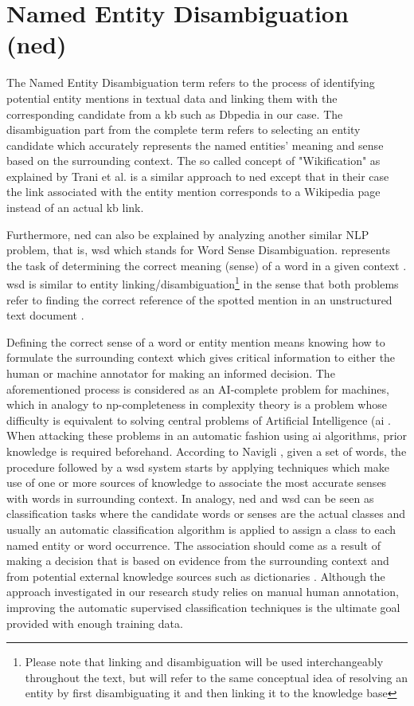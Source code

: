 \section{Named Entity Disambiguation (\ac{ned})}
The Named Entity Disambiguation term refers to the process of identifying potential entity mentions in textual data and linking them with the corresponding candidate from a \ac{kb} such as Dbpedia in our case. The disambiguation part from the complete term refers to selecting an entity candidate which accurately represents the named entities' meaning and sense based on the surrounding context. The so called concept of "Wikification" as explained by Trani et al. \cite{2} is a similar approach to \ac{ned} except that in their case the link associated with the entity mention corresponds to a Wikipedia page instead of an actual \ac{kb} link. 

Furthermore, \ac{ned} can also be explained by analyzing another similar NLP problem, that is, \ac{wsd} which stands for Word Sense Disambiguation. \cite{wsd} represents the task of determining the correct meaning (sense) of a word in a given context \cite{27}. \ac{wsd} is similar to entity linking/disambiguation\footnote{Please note that linking and disambiguation will be used interchangeably throughout the text, but will refer to the same conceptual idea of resolving an entity by first disambiguating it and then linking it to the knowledge base} in the sense that both problems refer to finding the correct reference of the spotted mention in an unstructured text document \cite{27}.

Defining the correct sense of a word or entity mention means knowing how to formulate the surrounding context which gives critical information to either the human or machine annotator for making an informed decision. The aforementioned process is considered as an AI-complete problem for machines, which in analogy to \ac{np}-completeness in complexity theory is a problem whose difficulty is equivalent to solving central problems of Artificial Intelligence (\ac{ai} \cite{30}. When attacking these problems in an automatic fashion using \ac{ai} algorithms, prior knowledge is required beforehand. According to Navigli \cite{30}, given a set of words, the procedure followed by a \ac{wsd} system starts by applying techniques which make use of one or more sources of knowledge to associate the most accurate senses with words in surrounding context. In analogy, \ac{ned} and \ac{wsd} can be seen as classification tasks where the candidate words or senses are the actual classes and usually an automatic classification algorithm is applied to assign a class to each named entity or word occurrence. The association should come as a result of making a decision that is based on evidence from the surrounding context and from potential external knowledge sources such as dictionaries \cite{30}. Although the approach investigated in our research study relies on manual human annotation, improving the automatic supervised classification techniques is the ultimate goal provided with enough training data.

